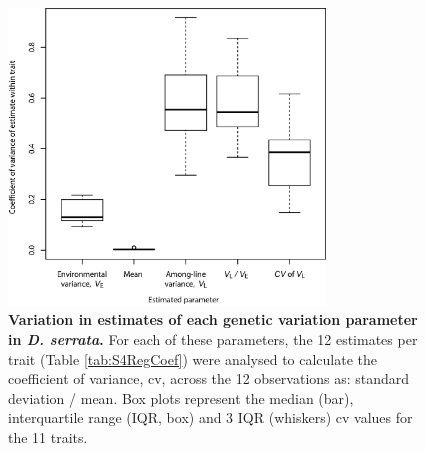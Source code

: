 \begin{figure}
    \centering
    \includegraphics[width=0.75\textwidth]{Supp/Chp2_Meta/S8.Est.CVs.eps}
    \vspace{-2cm}
    \caption[Variation in estimates of each genetic variation parameter in \textit{D. serrata}.]{\textbf{Variation in estimates of each genetic variation parameter in \textit{D. serrata}.} For each of these parameters, the 12 estimates per trait (Table \ref{tab:S4RegCoef}) were analysed to calculate the coefficient of variance, cv, across the 12 observations as: standard deviation / mean. Box plots represent the median (bar), interquartile range (IQR, box) and 3 IQR (whiskers) cv values for the 11 traits.}
    \label{fig:S8VarInCVs}
\end{figure}

